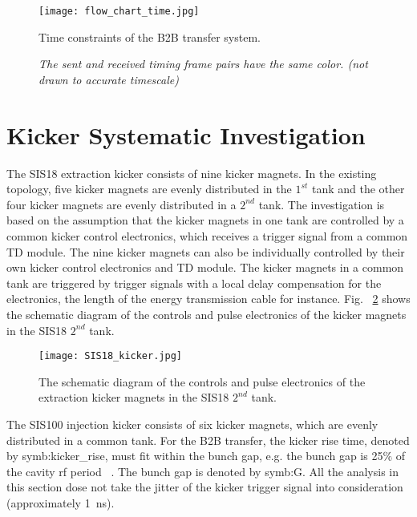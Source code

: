 \begin{landscape}
\begin{figure}[!htb]
   \centering   
   \texttt{[image: flow\_chart\_time.jpg]}
   \caption{Time constraints of the B2B transfer system.}
   \caption*{\textsl{\small{The sent and received timing frame pairs have the same color. (not drawn to accurate timescale) }}}
   \label{time_constraint}
\end{figure}
\end{landscape}

\section{Kicker Systematic Investigation}
\label{real_kicker}
The SIS18 extraction kicker consists of nine kicker magnets. In the existing topology, five kicker magnets are evenly distributed in the $1^{st}$ tank and the other four kicker magnets are evenly distributed in a $2^{nd}$ tank. The investigation is based on the assumption that the kicker magnets in one tank are controlled by a common kicker control electronics, which receives a trigger signal from a common TD module. The nine kicker magnets can also be individually controlled by their own kicker control electronics and TD module. The kicker magnets in a common tank are triggered by trigger signals with a local delay compensation for the electronics, the length of the energy transmission cable for instance. Fig. ~\ref{SIS18_kicker} shows the schematic diagram of the controls and pulse electronics of the kicker magnets in the SIS18 $2^{nd}$ tank. 
\begin{figure}[H]
   \centering   
   \texttt{[image: SIS18\_kicker.jpg]}
   \caption{The schematic diagram of the controls and pulse electronics of the extraction kicker magnets in the SIS18 $2^{nd}$ tank.}
   \label{SIS18_kicker}
\end{figure}

The SIS100 injection kicker consists of six kicker magnets, which are evenly distributed in a common tank. For the B2B transfer, the kicker rise time, denoted by \gls{symb:kicker_rise}, must fit within the bunch gap, e.g. the bunch gap is 25$\%$ of the cavity rf period ~\cite{blell_injection_2014, liebermann_sis100_2013}. The bunch gap is denoted by \gls{symb:G}.  All the analysis in this section dose not take the jitter of the kicker trigger signal into consideration (approximately \SI{1}{ns}). 


